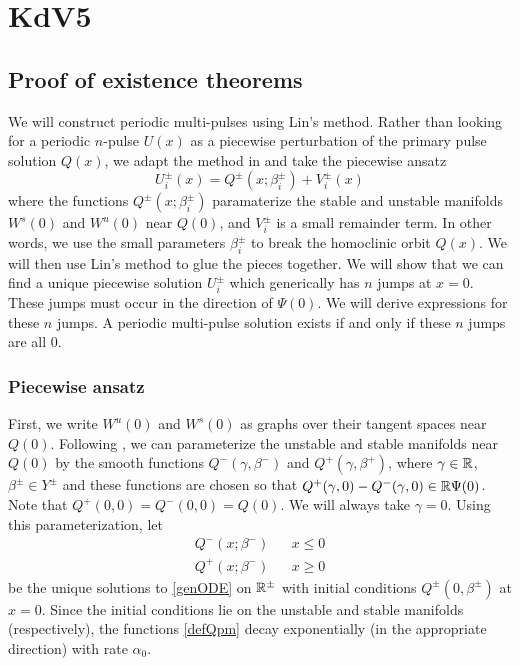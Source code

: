 \documentclass[thesis.tex]{subfiles}
\begin{document}
\iffulldocument\else
	\chapter{KdV5}
\fi

\section{Proof of existence theorems}

We will construct periodic multi-pulses using Lin's method. Rather than looking for a periodic $n$-pulse $U(x)$ as a piecewise perturbation of the primary pulse solution $Q(x)$, we adapt the method in \cite{Sandstede1997} and take the piecewise ansatz
\[
U_i^\pm(x) = Q^\pm(x; \beta_i^\pm) + V_i^\pm(x)
\]
where the functions $Q^\pm(x; \beta_i^\pm)$ paramaterize the stable and unstable manifolds $W^s(0)$ and $W^u(0)$ near $Q(0)$, and $V_i^\pm$ is a small remainder term. In other words, we use the small parameters $\beta_i^\pm$ to break the homoclinic orbit $Q(x)$. We will then use Lin's method to glue the pieces together. We will show that we can find a unique piecewise solution $U_i^\pm$ which generically has $n$ jumps at $x = 0$. These jumps must occur in the direction of $\Psi(0)$. We will derive expressions for these $n$ jumps. A periodic multi-pulse solution exists if and only if these $n$ jumps are all 0.

\subsection{Piecewise ansatz}

First, we write $W^u(0)$ and $W^s(0)$ as graphs over their tangent spaces near $Q(0)$. Following \cite{Sandstede1997}, we can parameterize the unstable and stable manifolds near $Q(0)$ by the smooth functions $Q^-(\gamma, \beta^-)$ and $Q^+(\gamma, \beta^+)$, where $\gamma \in \mathbb{R}$, $\beta^\pm \in Y^\pm$ and these functions are chosen so that $Q^+(\gamma, 0) - Q^-(\gamma, 0) \in \mathbb{R} \Psi(0)$. Note that $Q^+(0, 0) = Q^-(0, 0) = Q(0)$. We will always take $\gamma = 0$. Using this parameterization, let
\begin{equation}\label{defQpm}
\begin{aligned}
Q^-(x; \beta^-) && x \leq 0 \\
Q^+(x; \beta^-) && x \geq 0
\end{aligned}
\end{equation}
be the unique solutions to \eqref{genODE} on $\mathbb{R}^\pm$ with initial conditions $Q^\pm(0, \beta^\pm)$ at $x = 0$. Since the initial conditions lie on the unstable and stable manifolds (respectively), the functions \cref{defQpm} decay exponentially (in the appropriate direction) with rate $\alpha_0$.
\end{document}
